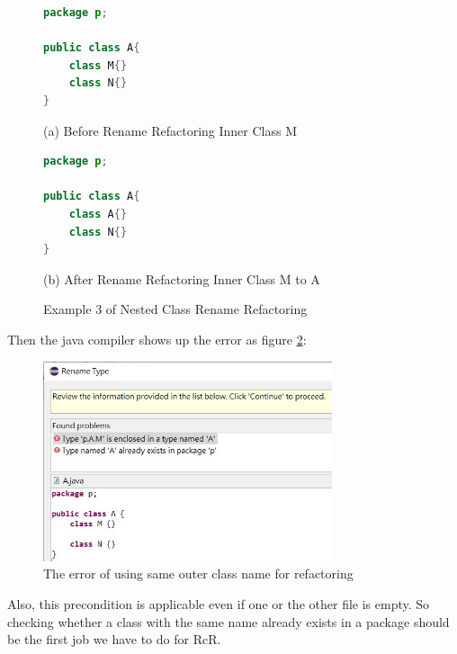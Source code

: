 \begin{figure}[th]
\centering
\begin{minipage}[t]{0.45\linewidth}
\begin{lstlisting}[language=java, basicstyle=\scriptsize\ttfamily,frame=single]
package p;

public class A{	
    class M{}
    class N{}
} 
\end{lstlisting}
\tiny{(a) Before Rename Refactoring Inner Class M}
\end{minipage}
\hfill
\begin{minipage}[t]{0.45\linewidth}
\begin{lstlisting}[language=java, basicstyle=\scriptsize\ttfamily,frame=single]
package p;

public class A{	
    class A{}
    class N{}
} 
\end{lstlisting}
\tiny{(b) After Rename Refactoring Inner Class M to A}
\end{minipage}
\caption{Example 3 of Nested Class Rename Refactoring}
\label{fig:nestedclass3}
\end{figure}

Then the java compiler shows up the error as figure \ref{fig:NC3}:

\begin{figure}[H]
\centerline{\includegraphics[width=85mm,scale=0.5]{NC3.jpg}}
\caption{The error of using same outer class name for refactoring}
\label{fig:NC3}
\end{figure}


Also, this precondition is applicable even if one or the other file is empty. So checking whether a class with the same name already exists in a package should be the first job we have to do for RcR. 
   
